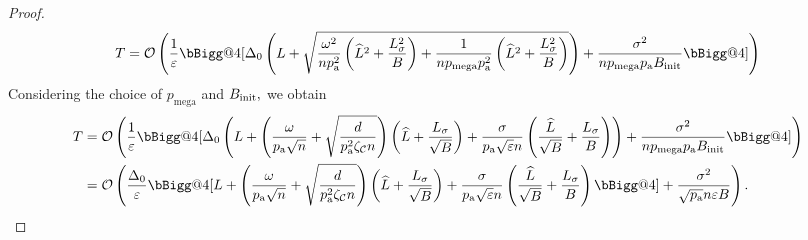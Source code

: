 \documentclass{article}
\makeatletter
\newcommand*{\probavailable}{\ensuremath{p_{\textnormal{a}}}}
\newcommand*{\probmega}{\ensuremath{p_{\text{mega}}}}
\newcommand{\vast}{\bBigg@{4}}
\makeatother
\begin{document}
\begin{proof}
  \begin{align*}
    T = \cO\left(\frac{1}{\varepsilon}\vast[\Delta_0\left(L + \sqrt{\frac{\omega^2}{n \probavailable^2}\left(\widehat{L}^2 + \frac{L_{\sigma}^2}{B}\right) + \frac{1}{n \probmega \probavailable^2} \left(\widehat{L}^2 + \frac{L_{\sigma}^2}{B}\right)}\right) + \frac{\sigma^2}{n \probmega \probavailable B_{\textnormal{init}}} \vast]\right)
  \end{align*}
  Considering the choice of $\probmega$ and $B_{\textnormal{init}},$ we obtain
  \begin{align*}
    T &=\cO\left(\frac{1}{\varepsilon}\vast[\Delta_0\left(L + \left(\frac{\omega}{\probavailable\sqrt{n}} + \sqrt{\frac{d}{\probavailable^2 \zeta_{\cC} n}}\right) \left(\widehat{L} + \frac{L_{\sigma}}{\sqrt{B}}\right)  + \frac{\sigma}{\probavailable \sqrt{\varepsilon} n} \left(\frac{\widehat{L}}{\sqrt{B}} + \frac{L_{\sigma}}{B}\right)\right) + \frac{\sigma^2}{n \probmega \probavailable B_{\textnormal{init}}} \vast]\right) \\
    &=\cO\left(\frac{\Delta_0}{\varepsilon}\vast[L + \left(\frac{\omega}{\probavailable\sqrt{n}} + \sqrt{\frac{d}{\probavailable^2 \zeta_{\cC} n}}\right) \left(\widehat{L} + \frac{L_{\sigma}}{\sqrt{B}}\right)  + \frac{\sigma}{\probavailable \sqrt{\varepsilon} n} \left(\frac{\widehat{L}}{\sqrt{B}} + \frac{L_{\sigma}}{B}\right)\vast] + \frac{\sigma^2}{\sqrt{\probavailable} n \varepsilon B}\right).
  \end{align*}
\end{proof}

\CONVERGENCESYNCPLMVR*
\end{document}
